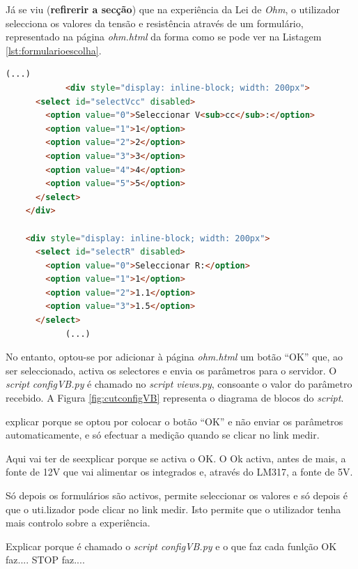 Já se viu (\textbf{refirerir a secção}) que na experiência da Lei de \textit{Ohm}, o utilizador selecciona os valores da tensão e resistência através de um formulário, representado na página \textit{ohm.html} da forma como se pode ver na Listagem \ref{lst:formularioescolha}.

\begin{center}
	\begin{minipage}{0.7\linewidth}
		\begin{lstlisting}[language=html, caption=Formulário de escolha na página \textit{ohm.html},label=lst:formularioescolha]
			(...)
			<div style="display: inline-block; width: 200px">
      <select id="selectVcc" disabled>
        <option value="0">Seleccionar V<sub>cc</sub>:</option>
        <option value="1">1</option>
        <option value="2">2</option>
        <option value="3">3</option>
        <option value="4">4</option>
        <option value="5">5</option>
      </select>
    </div>

    <div style="display: inline-block; width: 200px">
      <select id="selectR" disabled>
        <option value="0">Seleccionar R:</option>
        <option value="1">1</option>
        <option value="2">1.1</option>
        <option value="3">1.5</option>
      </select>
			(...)
	\end{lstlisting}
	\end{minipage}
\end{center}

No entanto, optou-se por adicionar à página \textit{ohm.html} um botão ``OK'' que, ao ser seleccionado, activa os selectores e envia os parâmetros para o servidor. O \textit{script} \textit{configVB.py} é chamado no \textit{script views.py}, consoante o valor do parâmetro recebido. A Figura \ref{fig:cutconfigVB} representa o diagrama de blocos do \textit{script}.

explicar porque se optou por colocar o botão ``OK'' e não enviar os parâmetros automaticamente, e só efectuar a medição quando se clicar no link medir.

Aqui vai ter de seexplicar porque se activa o OK. O Ok activa, antes de mais, a fonte de 12V que vai alimentar os integrados e, através do LM317, a fonte de 5V. 

Só depois os formulários são activos, permite seleccionar os valores e só depois é que o uti.lizador pode clicar no link medir.
Isto permite que o utilizador tenha mais controlo sobre a experiência.

Explicar porque é chamado o \textit{script configVB.py} e o que faz cada funlção
OK faz....
STOP faz....

